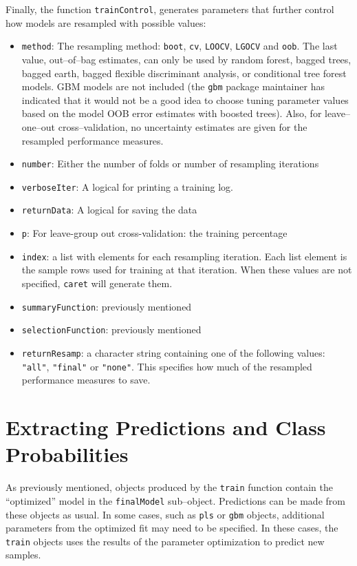\documentclass[12pt]{article}
\begin{document}
  Finally, the function \texttt{trainControl}, generates parameters that further control how models are resampled with possible values:
  \begin{itemize}
  \item \texttt{method}: The resampling method: \texttt{boot}, \texttt{cv}, \texttt{LOOCV}, \texttt{LGOCV}  and \texttt{oob}. The last value, out--of--bag estimates, can only be used by random forest, bagged trees, bagged earth, bagged flexible discriminant analysis, or conditional tree forest models. GBM models are not included (the \texttt{gbm} package maintainer has indicated that it would not be a good idea to choose tuning parameter values based on the model OOB error estimates with boosted trees). Also, for leave--one--out cross--validation, no uncertainty estimates are given for the resampled performance measures.
  \item \texttt{number}: Either the number of folds or number of resampling iterations
  \item \texttt{verboseIter}: A logical for printing a training log.
  \item \texttt{returnData}: A logical for saving the data
  \item \texttt{p}: For leave-group out cross-validation: the training percentage
  \item \texttt{index}: a list with elements for each resampling iteration. Each list element is the sample rows used for training at that iteration. When these values are not specified, \texttt{caret} will generate them.
  \item \texttt{summaryFunction}: previously  mentioned
  \item \texttt{selectionFunction}: previously  mentioned    
  \item \texttt{returnResamp}: a character string containing one of the following values: \texttt{"all"}, \texttt{"final"} or \texttt{"none"}. This specifies how much of the resampled performance measures to save. 
  \end{itemize}



\section{Extracting Predictions and Class Probabilities}

As previously mentioned, objects produced by the \texttt{train} function contain the ``optimized'' model in the \texttt{finalModel} sub--object. Predictions can be made from these objects as usual. In some cases, such as \texttt{pls} or \texttt{gbm} objects, additional  parameters from the optimized fit may need to be specified. In these cases, the \texttt{train} objects uses the results of the parameter optimization to predict new samples.
\end{document}
